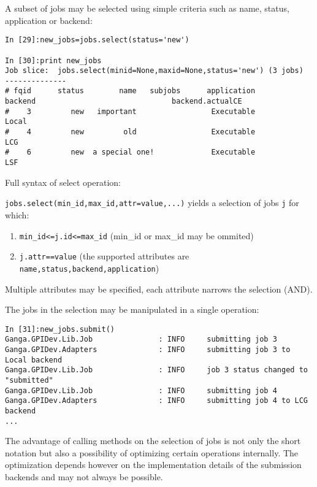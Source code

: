\documentclass{howto}
\begin{document}
A subset of jobs may be selected using simple criteria such as name, status, application or backend:

\begin{verbatim}
In [29]:new_jobs=jobs.select(status='new')

In [30]:print new_jobs
Job slice:  jobs.select(minid=None,maxid=None,status='new') (3 jobs)
--------------
# fqid      status        name   subjobs      application          backend                               backend.actualCE
#    3         new   important                 Executable            Local
#    4         new         old                 Executable              LCG
#    6         new  a special one!             Executable              LSF
\end{verbatim}

\begin{notice}
Full syntax of select operation:

\texttt{jobs.select(min_id,max_id,attr=value,...)} yields a selection of jobs \texttt{j} for which:
\begin{enumerate}
\item \texttt{min_id<=j.id<=max_id} (min_id or max_id may be ommited)
\item \texttt{j.attr==value} (the supported attributes are \texttt{name,status,backend,application})
\end{enumerate}

Multiple attributes may be specified, each attribute narrows the selection (AND).
\end{notice}


The jobs in the selection may be manipulated in a single operation:

\begin{verbatim}
In [31]:new_jobs.submit()
Ganga.GPIDev.Lib.Job               : INFO     submitting job 3
Ganga.GPIDev.Adapters              : INFO     submitting job 3 to Local backend
Ganga.GPIDev.Lib.Job               : INFO     job 3 status changed to "submitted"
Ganga.GPIDev.Lib.Job               : INFO     submitting job 4
Ganga.GPIDev.Adapters              : INFO     submitting job 4 to LCG backend
...
\end{verbatim}

The advantage of calling methods on the selection of jobs is not only
the short notation but also a possibility of optimizing certain
operations internally. The optimization depends however on the
implementation details of the submission backends and may not always
be possible.
\end{document}

